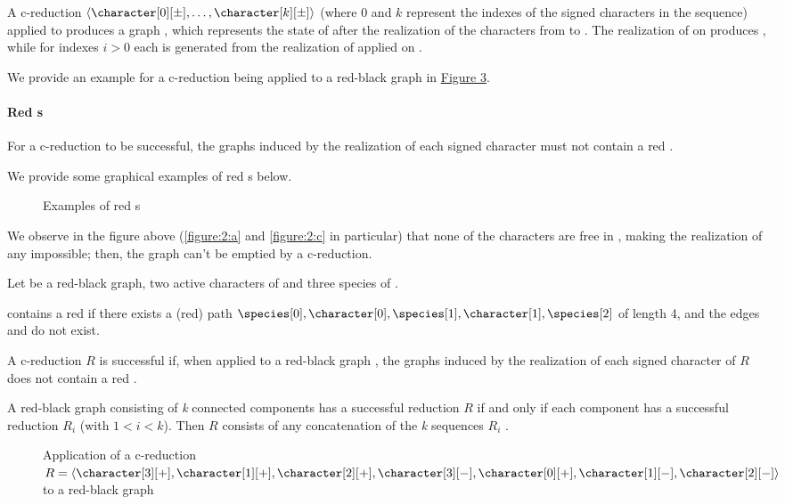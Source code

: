 A c-reduction $\langle \character[0][\pm], \dots, \character[k][\pm] \rangle$ (where $0$ and $k$ represent the indexes of the signed characters in the sequence) applied to \grb{} produces a graph \grb[k], which represents the state of \grb{} after the realization of the characters from \character[0][\pm] to \character[k][\pm].
The realization of \character[0][\pm] on \grb{} produces \grb[0], while for indexes $i > 0$ each \grb[i] is generated from the realization of \character[i][\pm] applied on \grb[i-1].

We provide an example for a c-reduction being applied to a red-black graph in \hyperref[figure:3]{Figure 3}.

\paragraph{Red \boldmath{\sg{}}s}

For a c-reduction to be successful, the graphs \grb[i] induced by the realization of each signed character \character[i][\pm] must not contain a red \sg{}.

We provide some graphical examples of red \sg{}s below.

\begin{figure}[h]
  

  \caption{Examples of red \sg{}s}\label{figure:2}
\end{figure}

We observe in the figure above (\ref{figure:2:a} and \ref{figure:2:c} in particular) that none of the characters are free in \grb{}, making the realization of any \character[i][-] impossible; then, the graph can't be emptied by a c-reduction.

\begin{definition}[Red \sg{}]\label{definition:sigma-graph}
  Let \grb{} be a red-black graph, \character[0] \character[1] two active characters of \grb{} and \species[0] \species[1] \species[2] three species of \grb{}.

  \grb{} contains a red \sg{} if there exists a (red) path $\species[0], \character[0], \species[1], \character[1], \species[2]$ of length 4, and the edges \edge{\character[0]}{\species[2]} and \edge{\character[1]}{\species[0]} do not exist.
\end{definition}

A c-reduction $R$ is successful if, when applied to a red-black graph \grb{}, the graphs \grb[i] induced by the realization of each signed character \character[i][\pm] of $R$ does not contain a red \sg{}.

A red-black graph consisting of \textit{k} connected components has a successful reduction $R$ if and only if each component has a successful reduction $R_{i}$ (with $1 < i < k$). Then $R$ consists of any concatenation of the \textit{k} sequences $R_{i}$ \cite{PPPptime2016}.

\begin{figure}[H]
  

  \caption{Application of a c-reduction $R = \langle \character[3][+], \character[1][+], \character[2][+], \character[3][-], \character[0][+], \character[1][-], \character[2][-] \rangle$ to a red-black graph \grb{}}\label{figure:3}
\end{figure}
